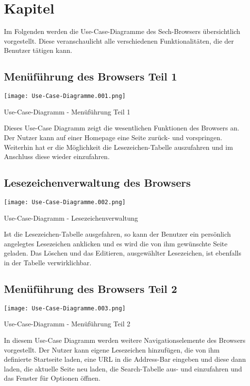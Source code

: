 
\chapter{Kapitel}

Im Folgenden werden die Use-Case-Diagramme des Sech-Browsers übersichtlich vorgestellt. Diese veranschaulicht alle verschiedenen Funktionalitäten, die der Benutzer tätigen kann.

\section{Menüführung des Browsers Teil 1}

\texttt{[image: Use-Case-Diagramme.001.png]}
	\caption{Use-Case-Diagramm - Menüführung Teil 1}
	\label{fig:Rankingablauf}
	
Dieses Use-Case Diagramm zeigt die wesentlichen Funktionen des Browsers an. Der Nutzer kann auf einer Homepage eine Seite zurück- und vorspringen. Weiterhin hat er die Möglichkeit die Lesezeichen-Tabelle auszufahren und im Anschluss diese wieder einzufahren.

\section{Lesezeichenverwaltung des Browsers}

\texttt{[image: Use-Case-Diagramme.002.png]}
	\caption{Use-Case-Diagramm - Lesezeichenverwaltung}
	\label{fig:Rankingablauf}

Ist die Lesezeichen-Tabelle ausgefahren, so kann der Benutzer ein persönlich angelegtes Lesezeichen anklicken und es wird die von ihm gewünschte Seite geladen. Das Löschen und das Editieren, ausgewählter Lesezeichen, ist ebenfalls in der Tabelle verwirklichbar.

\section{Menüführung des Browsers Teil 2}

\texttt{[image: Use-Case-Diagramme.003.png]}
	\caption{Use-Case-Diagramm - Menüführung Teil 2}
	\label{fig:Rankingablauf}

In diesem Use-Case Diagramm werden weitere Navigationselemente des Browsers vorgestellt. Der Nutzer kann eigene Lesezeichen hinzufügen, die von ihm definierte Startseite laden, eine URL in die Address-Bar eingeben und diese dann laden, die aktuelle Seite neu laden, die Search-Tabelle aus- und einzufahren und das Fenster für Optionen öffnen.

